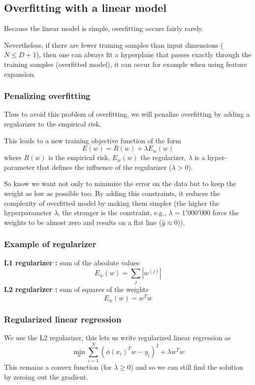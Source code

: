 \subsection{Overfitting with a linear model}
Because the linear model is simple, overfitting occurs fairly rarely. 

Nevertheless, if there are fewer training samples than input
dimensions ($N\leq D + 1$), then one can always fit a
hyperplane that passes exactly through the training samples (overfitted model), it can occur for example when using feature expansion.

\subsubsection{Penalizing overfitting}
Thus to avoid this problem of overfitting, we will penalize overfitting by adding a regularizer to the empirical risk. 

This leads to a new training objective function of the form \[
E(w) = R(w) + \lambda E_w(w)
\]
where $R(w)$ is the empirical risk, $E_w(w)$ the regularizer, $\lambda$ is a hyper-parameter that defines the influence of the regularizer ($\lambda > 0$). 

So know we want not only to minimize the error on the data but to keep the weight as low as possible too.
By adding this constraints, it reduces the complexity of overfitted model by making them simpler 
(the higher the hyperparameter $\lambda$, the stronger is the constraint, e.g., $\lambda = 1'000'000$ force the weights to be almost zero and results on a flat line ($\hat{y} \approx 0$)).

\subsubsection{Example of regularizer}
\textbf{L1 regularizer : } sum of the absolute values \[
  E_w(w) = \sum_{j} \left|w^{(j)}\right|
\]
\textbf{L2 regularizer : } sum of squares
of the weights\[
  E_w(w) = w^Tw
\]

\subsubsection{Regularized linear regression}
We use the L2 regularizer, this lets us write regularized linear regression as \[
  \min_w \sum_{i=1}^{N}(\phi(x_i)^Tw- y_i)^2 + \lambda w^Tw
\]
This remains a convex function (for $\lambda \geq 0$) and so we can still find the solution by zeroing out the gradient. 

